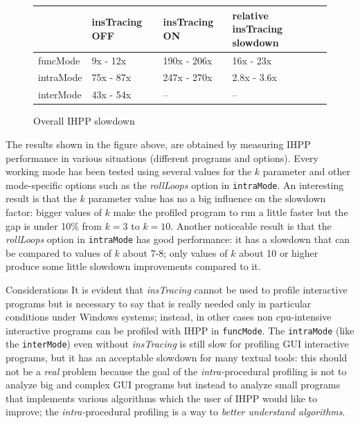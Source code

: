 \documentclass[a4paper,10pt]{report}
\begin{document}
\begin{figure}[H]

\centering

{\renewcommand{\arraystretch}{1.2}
\renewcommand{\tabcolsep}{0.2cm}
\begin{tabular}{l|l|l|l}
& insTracing OFF & insTracing ON & relative insTracing slowdown\\
\hline
funcMode & 9x - 12x & 190x - 206x & 16x - 23x\\
intraMode & 75x - 87x & 247x - 270x & 2.8x - 3.6x\\
interMode & 43x - 54x & -- & --\\
\end{tabular}}

\caption{Overall IHPP slowdown}
\label{totalslowdown}
\end{figure}

\noindent
The results shown in the figure above, are obtained by measuring 
IHPP performance in various situations (different programs and options).
Every working mode has been tested using 
several values for the $k$ parameter and other mode-specific options
such as the \emph{rollLoops} option in \verb|intraMode|. 
An interesting result is that the $k$ parameter value has no a
big influence on the slowdown factor: bigger values of $k$ make
the profiled program to run a little faster but the gap is under 10\%
from $k=3$ to $k=10$. Another noticeable result is that 
the \emph{rollLoops} option in \verb|intraMode| has good performance: 
it has a slowdown that can be compared to values of $k$ about 7-8; 
only values of $k$ about 10 or higher produce
some little slowdown improvements compared to it.

\begin{paragraph}{Considerations}
It is evident that \emph{insTracing} cannot be used to profile 
interactive programs but is necessary to say that is really needed 
only in particular conditions under Windows systems; instead,
in other cases non cpu-intensive interactive programs can be profiled with IHPP
in \verb|funcMode|. The \verb|intraMode| (like the \verb|interMode|) even without \emph{insTracing} is still slow for profiling GUI interactive programs, 
but it has an acceptable slowdown for
many textual tools: this should not be a \emph{real} problem because 
the goal of the \emph{intra-}procedural profiling is not to analyze big and complex
GUI programs but instead to analyze small programs that 
implements various algorithms which the user of IHPP would like to improve;
the \emph{intra-}procedural profiling is a way to \emph{better understand algorithms}.
\end{paragraph}
\end{document}
